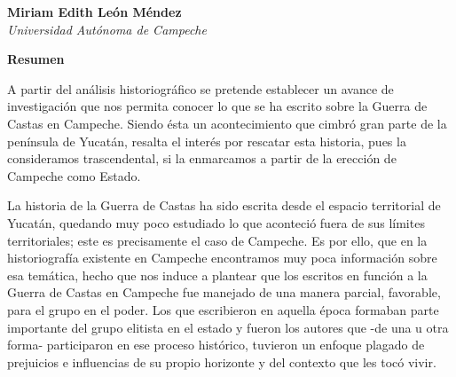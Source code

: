 %

\thispagestyle{empty}
{\par}
\setcounter{footnote}{0}

\bigskip
\begin{center}
{\bfseries Miriam  Edith León Méndez}\\
{\itshape Universidad Autónoma de Campeche}
\end{center}

\bigskip
\textbf{Resumen}

A partir del análisis historiográfico se pretende establecer un avance de
investigación que nos permita conocer lo que se ha escrito sobre la Guerra
de Castas en Campeche. Siendo ésta un acontecimiento que cimbró gran parte
de la península de Yucatán, resalta el interés por rescatar esta historia,
pues la consideramos trascendental, si la enmarcamos a partir de la
erección de Campeche como Estado. 

La historia de la Guerra de Castas ha sido escrita desde el espacio
territorial de Yucatán, quedando muy poco estudiado lo que aconteció fuera
de sus límites territoriales; este es precisamente el caso de Campeche. Es
por ello, que en la historiografía existente en Campeche encontramos muy
poca información sobre esa temática, hecho que nos induce a plantear que
los escritos en función a la Guerra de Castas en Campeche fue manejado de
una manera parcial, favorable, para el grupo en el poder. Los que
escribieron en aquella época  formaban parte importante del grupo elitista
en el estado y fueron los autores que -de una u otra forma- participaron en
ese proceso histórico, tuvieron un enfoque plagado de prejuicios e
influencias de su propio horizonte y del contexto que les tocó vivir.

